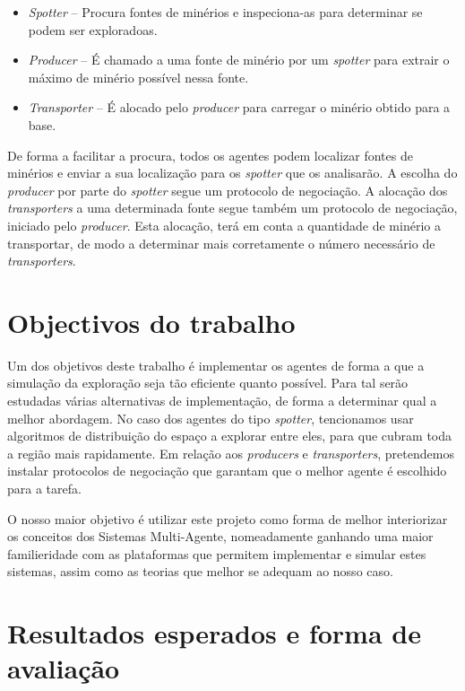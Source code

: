 \documentclass[12pt]{report}
\begin{document}
\begin{itemize}
  \item \emph{Spotter} – Procura fontes de minérios e inspeciona-as para determinar se podem ser exploradoas. 
  \item \emph{Producer} – É chamado a uma fonte de minério por um \emph{spotter} para extrair o máximo de minério possível nessa fonte. 
  \item \emph{Transporter} – É alocado pelo \emph{producer} para carregar o minério obtido para a base.
\end{itemize}

De forma a facilitar a procura, todos os agentes podem localizar fontes de minérios e enviar a sua localização para os \emph{spotter} que os analisarão. A escolha do \emph{producer} por parte do \emph{spotter} segue um protocolo de negociação. A alocação dos \emph{transporters} a uma determinada fonte segue também um protocolo de negociação, iniciado pelo \emph{producer}. Esta alocação, terá em conta a quantidade de minério a transportar, de modo a determinar mais corretamente o número necessário de \emph{transporters}.

\section{Objectivos do trabalho}

Um dos objetivos deste trabalho é implementar os agentes de forma a que a simulação da exploração seja tão eficiente quanto possível. Para tal serão estudadas várias alternativas de implementação, de forma a determinar qual a melhor abordagem. No caso dos agentes do tipo \emph{spotter}, tencionamos usar algoritmos de distribuição do espaço a explorar entre eles, para que cubram toda a região mais rapidamente. Em relação aos \emph{producers} e \emph{transporters}, pretendemos instalar protocolos de negociação que garantam que o melhor agente é escolhido para a tarefa.

O nosso maior objetivo é utilizar este projeto como forma de melhor interiorizar os conceitos dos Sistemas Multi-Agente, nomeadamente ganhando uma maior familieridade com as plataformas que permitem implementar e simular estes sistemas, assim como as teorias que melhor se adequam ao nosso caso.

\section{Resultados esperados e forma de avaliação}
\end{document}
